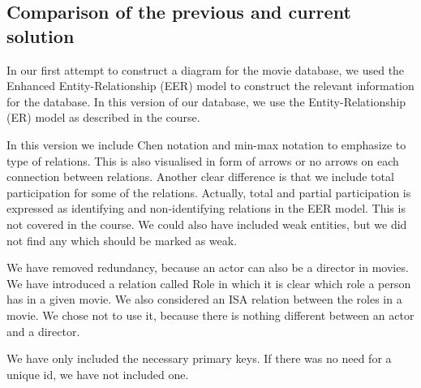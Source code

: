 \subsection{Comparison of the previous and current solution}

In our first attempt to construct a diagram for the movie database, we used the Enhanced Entity-Relationship (EER) model to construct the relevant information for the database.
In this version of our database, we use the Entity-Relationship (ER) model as described in the course.

In this version we include Chen notation and min-max notation to emphasize to type of relations. 
This is also visualised in form of arrows or no arrows on each connection between relations.
Another clear difference is that we include total participation for some of the relations.
Actually, total and partial participation is expressed as identifying and non-identifying relations in the EER model. This is not covered in the course.
We could also have included weak entities, but we did not find any which should be marked as weak. 

We have removed redundancy, because an actor can also be a director in movies.
We have introduced a relation called Role in which it is clear which role a person has in a given movie.
We also considered an ISA relation between the roles in a movie.
We chose not to use it, because there is nothing different between an actor and a director.

We have only included the necessary primary keys. 
If there was no need for a unique id, we have not included one.
